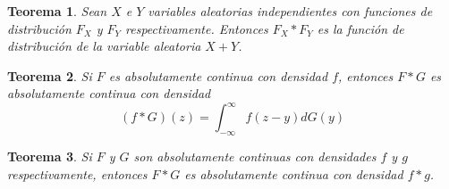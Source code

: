 \documentclass{report}
\newtheorem{theorem}{Teorema}[chapter]
\theoremstyle{remark}
\theoremstyle{remark}
\theoremstyle{remark}
\theoremstyle{definition}
\theoremstyle{definition}
\theoremstyle{definition}
\theoremstyle{definition}
\begin{document}
\begin{theorem}
    Sean $X$ e $Y$ variables aleatorias independientes con funciones de distribución $F_X$ y $F_Y$ respectivamente.
    Entonces $F_X \ast F_Y$ es la función de distribución de la variable aleatoria $X+Y$.
\end{theorem}

\begin{theorem}
    Si $F$ es absolutamente continua con densidad $f$, entonces $F \ast G$ es absolutamente continua con densidad
    $$(f \ast G)(z) = \int_{-\infty}^\infty f(z-y)dG(y)$$
\end{theorem}

\begin{theorem}
    Si $F$ y $G$ son absolutamente continuas con densidades $f$ y $g$ respectivamente, entonces $F \ast G$ es absolutamente continua con densidad $f \ast g$.
\end{theorem}
\end{document}
